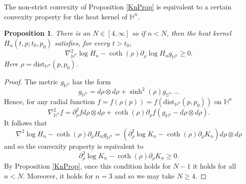 \documentclass{amsart}
\newtheorem{prop}[thm]{Proposition}
\theoremstyle{definition}
\theoremstyle{remark}
\numberwithin{equation}{section}
\newcommand{\dist}[0]{\mathrm{dist}}
\begin{document}


The non-strict convexity of Proposition \ref{KnProp} is equivalent to a certain convexity property for the heat kernel of $\mathbb{H}^n$.
\begin{prop} \label{HeatKernelConvexityEstProp}
	There is an $N\in [4,\infty]$ so if $n<N$, then the heat kernel $H_n(t,p; t_0, p_0)$ satisfies,  for every $t>t_0$,
	$$
	\nabla_{\mathbb{H}^n}^2 \log H_n - \coth(\rho) \partial_\rho \log H_n g_{\mathbb{H}^n} \geq 0.
	$$
	Here $\rho=\dist_{\mathbb{H}^n}(p,p_0)$.
\end{prop}
\begin{proof}
	

%	
%	
	
    The metric $g_{\mathbb{H}^n}$ has the form
	$$
	g_{\mathbb{H}^n}=d\rho \otimes d\rho +\sinh^2(\rho) g_{\mathbb{S}^{n-1}}.
	$$
	Hence, for any radial function $f=f(\rho(p))=f(\dist_{\mathbb{H}^n}(p,p_0))$ on $\mathbb{H}^n$
	$$
	\nabla^2_{\mathbb{H}^n} f=\partial^2_\rho f d\rho \otimes d\rho + \coth(\rho) \partial_\rho f  (g_{\mathbb{H}^n} -d\rho\otimes d\rho).
	$$
It follows that
	$$
	\nabla^2\log H_n-\coth(\rho) \partial_\rho H_n g_{\mathbb{H}^n}=(\partial^2_\rho \log K_n -\coth(\rho) \partial_\rho K_n) d\rho\otimes d\rho
	$$
	and so the convexity property is equivalent to
	$$
	\partial^2_\rho \log K_n -\coth(\rho) \partial_\rho K_n \geq 0.
	$$
	By Proposition \ref{KnProp}, once this condition holds for $N-1$ it holds for all $n<N$.  Moreover, it holds for $n=3$ and so we may take $N\geq 4$.
\end{proof}
\end{document}
